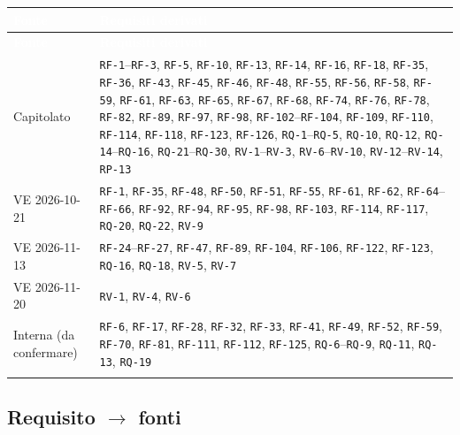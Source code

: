 \documentclass[12pt,a4paper]{article}
\newcommand{\thc}[1]{\textcolor{white}{\textbf{#1}}}
\newcommand{\rl}{\\ \arrayrulecolor{bfline}\hline}
\begin{document}
\begin{longtable}{>{\raggedright\arraybackslash}p{}>{\raggedright\arraybackslash}p{}}
\rowcolor{bfblue}\thc{Fonte} & \thc{Requisiti derivati} \\
\endfirsthead
\rowcolor{bfblue}\thc{Fonte} & \thc{Requisiti derivati} \\
\endhead
Capitolato & \texttt{RF-1}--\texttt{RF-3}, \texttt{RF-5}, \texttt{RF-10}, \texttt{RF-13}, \texttt{RF-14}, \texttt{RF-16}, \texttt{RF-18}, \texttt{RF-35}, \texttt{RF-36}, \texttt{RF-43}, \texttt{RF-45}, \texttt{RF-46}, \texttt{RF-48}, \texttt{RF-55}, \texttt{RF-56}, \texttt{RF-58}, \texttt{RF-59}, \texttt{RF-61}, \texttt{RF-63}, \texttt{RF-65}, \texttt{RF-67}, \texttt{RF-68}, \texttt{RF-74}, \texttt{RF-76}, \texttt{RF-78}, \texttt{RF-82}, \texttt{RF-89}, \texttt{RF-97}, \texttt{RF-98}, \texttt{RF-102}--\texttt{RF-104}, \texttt{RF-109}, \texttt{RF-110}, \texttt{RF-114}, \texttt{RF-118}, \texttt{RF-123}, \texttt{RF-126}, \texttt{RQ-1}--\texttt{RQ-5}, \texttt{RQ-10}, \texttt{RQ-12}, \texttt{RQ-14}--\texttt{RQ-16}, \texttt{RQ-21}--\texttt{RQ-30}, \texttt{RV-1}--\texttt{RV-3}, \texttt{RV-6}--\texttt{RV-10}, \texttt{RV-12}--\texttt{RV-14}, \texttt{RP-13} \rl

VE 2026-10-21 & \texttt{RF-1}, \texttt{RF-35}, \texttt{RF-48}, \texttt{RF-50}, \texttt{RF-51}, \texttt{RF-55}, \texttt{RF-61}, \texttt{RF-62}, \texttt{RF-64}--\texttt{RF-66}, \texttt{RF-92}, \texttt{RF-94}, \texttt{RF-95}, \texttt{RF-98}, \texttt{RF-103}, \texttt{RF-114}, \texttt{RF-117}, \texttt{RQ-20}, \texttt{RQ-22}, \texttt{RV-9} \rl

VE 2026-11-13 & \texttt{RF-24}--\texttt{RF-27}, \texttt{RF-47}, \texttt{RF-89}, \texttt{RF-104}, \texttt{RF-106}, \texttt{RF-122}, \texttt{RF-123}, \texttt{RQ-16}, \texttt{RQ-18}, \texttt{RV-5}, \texttt{RV-7} \rl

VE 2026-11-20 & \texttt{RV-1}, \texttt{RV-4}, \texttt{RV-6} \rl

Interna (da confermare) & \texttt{RF-6}, \texttt{RF-17}, \texttt{RF-28}, \texttt{RF-32}, \texttt{RF-33}, \texttt{RF-41}, \texttt{RF-49}, \texttt{RF-52}, \texttt{RF-59}, \texttt{RF-70}, \texttt{RF-81}, \texttt{RF-111}, \texttt{RF-112}, \texttt{RF-125}, \texttt{RQ-6}--\texttt{RQ-9}, \texttt{RQ-11}, \texttt{RQ-13}, \texttt{RQ-19} \rl

\end{longtable}

\subsection{Requisito \texorpdfstring{$\rightarrow$}{->} fonti}
\end{document}
